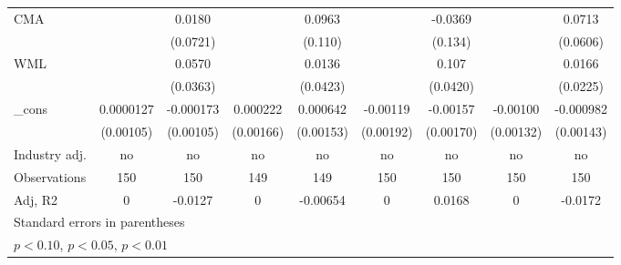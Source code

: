 {\begin{tabular}{l*{8}{c}}
CMA                 &                     &      0.0180         &                     &      0.0963         &                     &     -0.0369         &                     &      0.0713         \\
                    &                     &    (0.0721)         &                     &     (0.110)         &                     &     (0.134)         &                     &    (0.0606)         \\
WML                 &                     &      0.0570         &                     &      0.0136         &                     &       0.107\sym{**} &                     &      0.0166         \\
                    &                     &    (0.0363)         &                     &    (0.0423)         &                     &    (0.0420)         &                     &    (0.0225)         \\
\_cons              &   0.0000127         &   -0.000173         &    0.000222         &    0.000642         &    -0.00119         &    -0.00157         &    -0.00100         &   -0.000982         \\
                    &   (0.00105)         &   (0.00105)         &   (0.00166)         &   (0.00153)         &   (0.00192)         &   (0.00170)         &   (0.00132)         &   (0.00143)         \\
\hline
Industry adj.       &          no         &          no         &          no         &          no         &          no         &          no         &          no         &          no         \\
Observations        &         150         &         150         &         149         &         149         &         150         &         150         &         150         &         150         \\
Adj, R2             &           0         &     -0.0127         &           0         &    -0.00654         &           0         &      0.0168         &           0         &     -0.0172         \\
\hline\hline
\multicolumn{9}{l}{\footnotesize Standard errors in parentheses}\\
\multicolumn{9}{l}{\footnotesize \sym{*} \(p<0.10\), \sym{**} \(p<0.05\), \sym{***} \(p<0.01\)}\\
\end{tabular}
}
